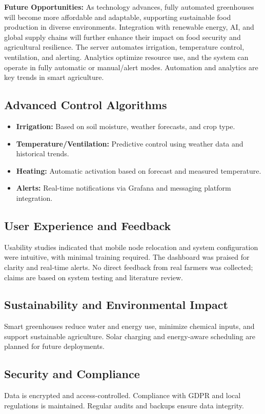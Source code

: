 \documentclass[12pt,a4paper]{article}
\begin{document}
\textbf{Future Opportunities:} As technology advances, fully automated greenhouses will become more affordable and adaptable, supporting sustainable food production in diverse environments. Integration with renewable energy, AI, and global supply chains will further enhance their impact on food security and agricultural resilience.
The server automates irrigation, temperature control, ventilation, and alerting. Analytics optimize resource use, and the system can operate in fully automatic or manual/alert modes. Automation and analytics are key trends in smart agriculture.

\subsection{Advanced Control Algorithms}
\begin{itemize}
    \item \textbf{Irrigation:} Based on soil moisture, weather forecasts, and crop type.
    \item \textbf{Temperature/Ventilation:} Predictive control using weather data and historical trends.
    \item \textbf{Heating:} Automatic activation based on forecast and measured temperature.
    \item \textbf{Alerts:} Real-time notifications via Grafana and messaging platform integration.
\end{itemize}

\subsection{User Experience and Feedback}
Usability studies indicated that mobile node relocation and system configuration were intuitive, with minimal training required. The dashboard was praised for clarity and real-time alerts. No direct feedback from real farmers was collected; claims are based on system testing and literature review.

\subsection{Sustainability and Environmental Impact}
Smart greenhouses reduce water and energy use, minimize chemical inputs, and support sustainable agriculture. Solar charging and energy-aware scheduling are planned for future deployments.

\subsection{Security and Compliance}
Data is encrypted and access-controlled. Compliance with GDPR and local regulations is maintained. Regular audits and backups ensure data integrity.
\end{document}
